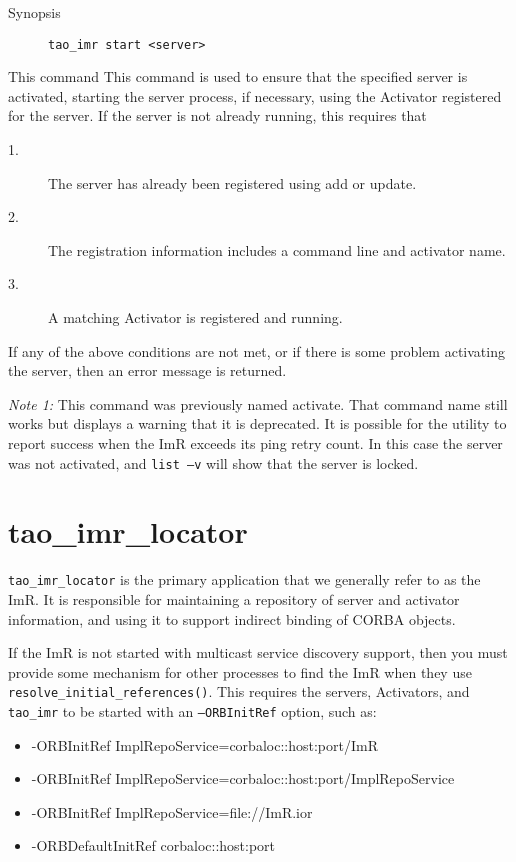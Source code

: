\begin{description}
    \item [Synopsis] {\tt tao\_imr start <server>}
\end{description}

This command This command is used to ensure that the specified server
is activated, starting the server process, if necessary, using the Activator
 registered for the server. If the server is not already running, this requires
that

\begin{description}
\item[1.] The server has already been registered using add or update.
\item[2.] The registration information includes a command line and activator name.
\item[3.] A matching Activator is registered and running.
\end{description}

If any of the above conditions are not met, or if there is some problem activating the server,
then an error message is returned.

\emph {Note 1:}  This command was previously named activate.  That command name still
works but displays a warning that it is deprecated.  It is possible for the utility to report
success when the ImR exceeds its ping retry count. In this case the server was not activated,
and {\tt list –v} will show that the server is locked.

\section{tao\_imr\_locator}
\label{taoimrlocator}

{\tt tao\_imr\_locator} is the primary application that we generally refer to as the ImR. It is responsible
for maintaining a repository of server and activator information, and using it to support indirect binding
of CORBA objects.

If the ImR is not started with multicast service discovery support, then you must provide some
mechanism for other processes to find the ImR when they use {\tt resolve\_initial\_references()}.
This requires the servers,  Activators, and {\tt tao\_imr} to be started with an {\tt –ORBInitRef}
option, such as:

\small{
\begin{itemize}
\item -ORBInitRef ImplRepoService=corbaloc::host:port/ImR
\item -ORBInitRef ImplRepoService=corbaloc::host:port/ImplRepoService
\item -ORBInitRef ImplRepoService=file://ImR.ior
\item -ORBDefaultInitRef corbaloc::host:port
\end{itemize}
}

